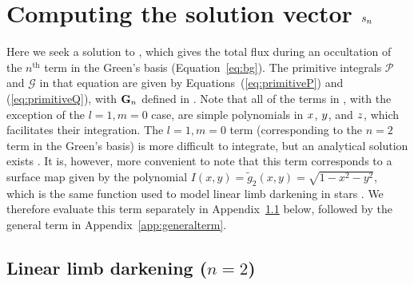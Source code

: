 \documentclass[modern]{aastex61}
\begin{document}
\section{Computing the solution vector $\MakeLowercase{s_n}$}
\label{app:solutionvector}

Here we seek a solution to , which gives the total flux
during an occultation of the $n^\mathrm{th}$ term in the Green's basis
(Equation~\ref{eq:bg}). The primitive integrals $\mathcal{P}$ and
$\mathcal{G}$ in that equation are given by Equations~(\ref{eq:primitiveP})
and (\ref{eq:primitiveQ}), with
${\mathbf{G}}_n$ defined in . Note that all of the terms in ,
with the exception of the $l = 1, m = 0$ case, are simple polynomials
in $\mbox{$x$}$, $\mbox{$y$}$, and $\mbox{$z$}$, which facilitates their integration.
The $l = 1, m = 0$ term (corresponding to the $n = 2$ term in the Green's basis)
is more difficult to integrate, but an analytical
solution exists \citep{Pal2012}. It is, however, more convenient
to note that this term corresponds to a surface map given by the polynomial
$I(x, y) = \tilde{g}_2(x, y) = \sqrt{1 - x^2 - y^2}$, which is the same function used
to model linear limb darkening in stars \citep{MandelAgol2002}. We therefore
evaluate this term separately in Appendix~\ref{app:linearld} below, followed by
the general term in Appendix~\ref{app:generalterm}.

\subsection{Linear limb darkening ($n = 2$)}
\label{app:linearld}
\end{document}
